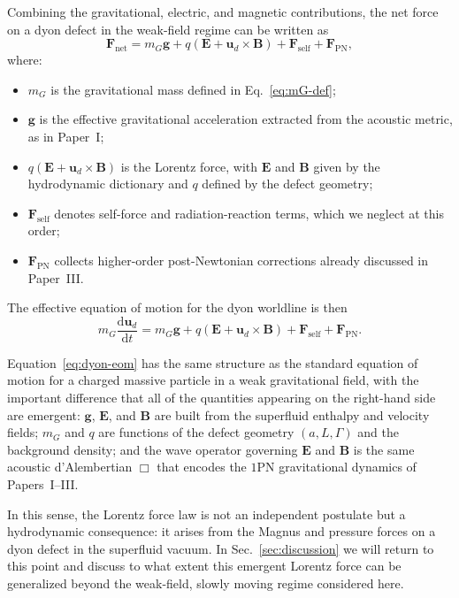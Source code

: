 \documentclass[11pt]{article}
\newcommand{\dd}{\mathrm{d}}
\begin{document}
Combining the gravitational, electric, and magnetic contributions, the net force on a dyon defect in the weak-field regime can be written as
\begin{equation}
\mathbf{F}_{\mathrm{net}}
= m_G \mathbf{g}
+ q\left(\mathbf{E} + \mathbf{u}_d \times \mathbf{B}\right)
+ \mathbf{F}_{\mathrm{self}} + \mathbf{F}_{\mathrm{PN}},
\label{eq:F-net}
\end{equation}
where:
\begin{itemize}
  \item $m_G$ is the gravitational mass defined in Eq.~\eqref{eq:mG-def};
  \item $\mathbf{g}$ is the effective gravitational acceleration extracted from the acoustic metric, as in Paper~I;
  \item $q(\mathbf{E} + \mathbf{u}_d \times \mathbf{B})$ is the Lorentz force, with $\mathbf{E}$ and $\mathbf{B}$ given by the hydrodynamic dictionary and $q$ defined by the defect geometry;
  \item $\mathbf{F}_{\mathrm{self}}$ denotes self-force and radiation-reaction terms, which we neglect at this order;
  \item $\mathbf{F}_{\mathrm{PN}}$ collects higher-order post-Newtonian corrections already discussed in Paper~III.
\end{itemize}
The effective equation of motion for the dyon worldline is then
\begin{equation}
m_G \frac{\dd \mathbf{u}_d}{\dd t}
= m_G \mathbf{g}
+ q\left(\mathbf{E} + \mathbf{u}_d \times \mathbf{B}\right)
+ \mathbf{F}_{\mathrm{self}} + \mathbf{F}_{\mathrm{PN}}.
\label{eq:dyon-eom}
\end{equation}

Equation~\eqref{eq:dyon-eom} has the same structure as the standard equation of motion for a charged massive particle in a weak gravitational field, with the important difference that all of the quantities appearing on the right-hand side are emergent: $\mathbf{g}$, $\mathbf{E}$, and $\mathbf{B}$ are built from the superfluid enthalpy and velocity fields; $m_G$ and $q$ are functions of the defect geometry $(a,L,\Gamma)$ and the background density; and the wave operator governing $\mathbf{E}$ and $\mathbf{B}$ is the same acoustic d'Alembertian $\Box$ that encodes the $1$PN gravitational dynamics of Papers~I--III.

In this sense, the Lorentz force law is not an independent postulate but a hydrodynamic consequence: it arises from the Magnus and pressure forces on a dyon defect in the superfluid vacuum.  In Sec.~\ref{sec:discussion} we will return to this point and discuss to what extent this emergent Lorentz force can be generalized beyond the weak-field, slowly moving regime considered here.
\end{document}
